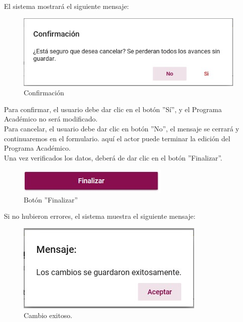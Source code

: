         El sistema mostrará el siguiente mensaje:
        \begin{figure}[H]
            \centering
            \hypertarget{confirmar}{\includegraphics[width=0.7\linewidth]{images/SP3/Confirmacion}}
            \caption{Confirmación}
            \label{confirmar}
        \end{figure}

        Para confirmar, el usuario debe dar clic en el botón ''Sí'', y el Programa Académico no será modificado.\\

        Para cancelar, el usuario debe dar clic en botón ''No'', el mensaje se cerrará y continuaremos en el formulario. aquí el actor puede terminar la edición del Programa Académico.\\

        Una vez verificados los datos, deberá de dar clic en el botón ''Finalizar''.
        \begin{figure}[H]
        	\centering
        	\hypertarget{btnfin}{\includegraphics[width=0.7\linewidth]{images/SP3/BtnFinalizar}}
        	\caption{Botón ''Finalizar''}
        	\label{btnfin}
        \end{figure}

        Si no hubieron errores, el sistema muestra el siguiente mensaje:

        \begin{figure}[H]
            \centering
            \hypertarget{cambio}{\includegraphics[width=0.7\linewidth]{images/SP3/Cambio}}
            \caption{Cambio exitoso.}
            \label{cambio}
        \end{figure}

